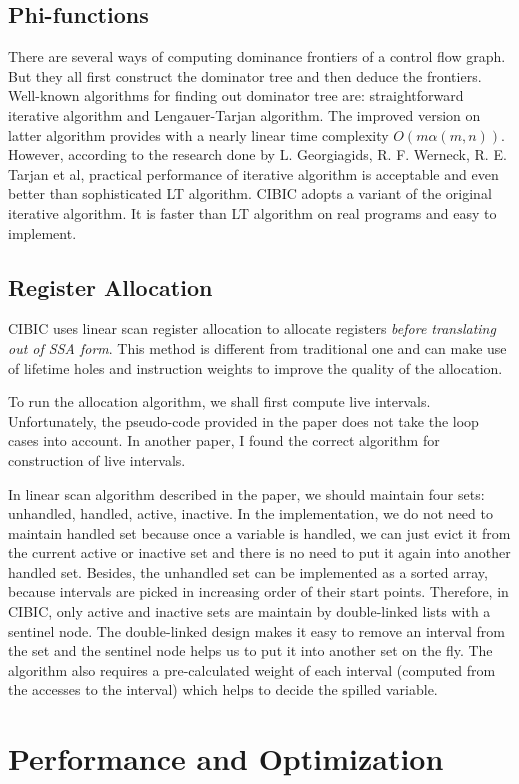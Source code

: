 \documentclass[10pt, a4paper]{article}
\begin{document}
\subsection{Phi-functions}
There are several ways of computing dominance frontiers of a control flow graph.
But they all first construct the dominator tree and then deduce the frontiers.
Well-known algorithms for finding out dominator tree are: straightforward
iterative algorithm and Lengauer-Tarjan algorithm. The improved version on
latter algorithm provides with a nearly linear time complexity $O(m \alpha(m,
n))$. However, according to the research done by L. Georgiagids, R.  F. Werneck,
R. E. Tarjan et al, practical performance of iterative algorithm is acceptable
and even better than sophisticated LT algorithm. CIBIC adopts a variant of the
original iterative algorithm. It is faster than LT algorithm on real programs
and easy to implement.
\subsection{Register Allocation}
CIBIC uses linear scan register allocation to allocate registers \emph{before
translating out of SSA form}. This method is different from traditional one and
can make use of lifetime holes and instruction weights to improve the quality of
the allocation.

To run the allocation algorithm, we shall first compute live intervals.
Unfortunately, the pseudo-code provided in the paper does not take the loop
cases into account. In another paper, I found the correct algorithm for
construction of live intervals.

In linear scan algorithm described in the paper, we should maintain four sets:
unhandled, handled, active, inactive. In the implementation, we do not need to
maintain handled set because once a variable is handled, we can just evict it
from the current active or inactive set and there is no need to put it again
into another handled set. Besides, the unhandled set can be implemented as a
sorted array, because intervals are picked in increasing order of their start
points. Therefore, in CIBIC, only active and inactive sets are maintain by
double-linked lists with a sentinel node. The double-linked design makes it easy
to remove an interval from the set and the sentinel node helps us to put it into
another set on the fly. The algorithm also requires a pre-calculated weight of
each interval (computed from the accesses to the interval) which helps to decide
the spilled variable.
\section{Performance and Optimization}
\end{document}

